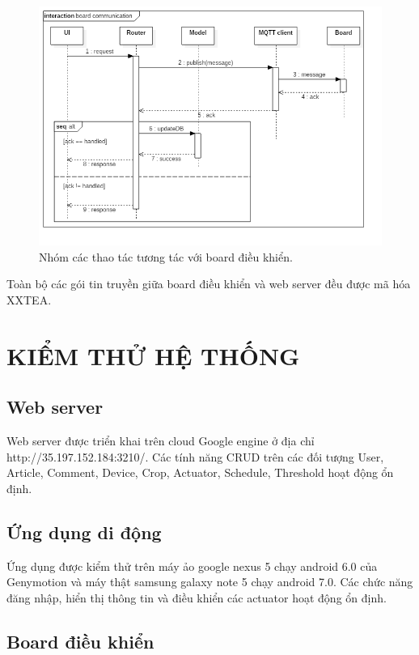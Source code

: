 \documentclass[a4paper,12pt,oneside]{article}
\begin{document}
\begin{figure}[H]
\begin{center}
\includegraphics[scale=.6]{hinh/seq-board-communication.png}
\end{center}
\caption{Nhóm các thao tác tương tác với board điều khiển.}
\end{figure}

\noindent Toàn bộ các gói tin truyền giữa board điều khiển và web server đều được mã hóa XXTEA.

\newpage
\section{KIỂM THỬ HỆ THỐNG}
\subsection{Web server}
\noindent Web server được triển khai trên cloud Google engine ở địa chỉ http://35.197.152.184:3210/. Các tính năng CRUD trên các đối tượng User, Article, Comment, Device, Crop, Actuator, Schedule, Threshold hoạt động ổn định. 
\subsection{Ứng dụng di động}
\noindent Ứng dụng được kiểm thử trên máy ảo google nexus 5 chạy android 6.0 của Genymotion và máy thật samsung galaxy note 5 chạy android 7.0. Các chức năng đăng nhập, hiển thị thông tin và điều khiển các actuator hoạt động ổn định.
\subsection{Board điều khiển}
\end{document}
